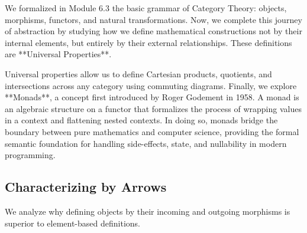 \documentclass[12pt, a4paper]{article}
\begin{document}
We formalized in Module 6.3 the basic grammar of Category Theory: objects, morphisms, functors, and natural transformations.
Now, we complete this journey of abstraction by studying how we define mathematical constructions not by their internal elements, but entirely by their external relationships.
These definitions are **Universal Properties**.

Universal properties allow us to define Cartesian products, quotients, and intersections across any category using commuting diagrams.
Finally, we explore **Monads**, a concept first introduced by Roger Godement in 1958.
A monad is an algebraic structure on a functor that formalizes the process of wrapping values in a context and flattening nested contexts.
In doing so, monads bridge the boundary between pure mathematics and computer science, providing the formal semantic foundation for handling side-effects, state, and nullability in modern programming.

\subsection{Characterizing by Arrows}

We analyze why defining objects by their incoming and outgoing morphisms is superior to element-based definitions.
\end{document}
